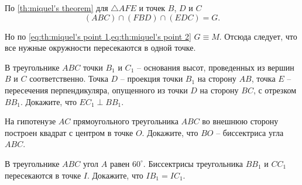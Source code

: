 \begin{tasks}
\begin{tasks}
{            По \cref{th:miquel's theorem} для $\triangle AFE$ и точек $B$, $D$ и $C$
            \begin{equation}
                (ABC) \cap (FBD) \cap (EDC) = G. \label{eq:th:miquel's point 2}
            \end{equation}
            
            Но по \cref{eq:th:miquel's point 1,eq:th:miquel's point 2} $G \equiv M$. Отсюда следует, что все нужные окружности пересекаются в одной точке.
        }
    \end{tasks}

    
    \item В треугольнике $ABC$ точки $B_1$ и $C_1$ -- основания высот, проведенных из вершин $B$ и $C$ соответственно. Точка $D$ -- проекция точки $B_1$ на сторону $AB$, точка $E$ -- пересечения перпендикуляра, опущенного из точки $D$ на сторону $BC$, с отрезком $BB_1$. Докажите, что $EC_1 \perp BB_1$. 


    \item На гипотенузе $AC$ прямоугольного треугольника $ABC$ во вне\-шнюю сторону построен квадрат с центром в точке $O$. Докажите, что $BO$ -- биссектриса угла $ABC$. 


    \item В треугольнике $ABC$ угол $A$ равен $60^\circ$. Биссектрисы треугольника $BB_1$ и $CC_1$ пересекаются в точке $I$. Докажите, что $IB_1=IC_1$. 



\end{tasks}
